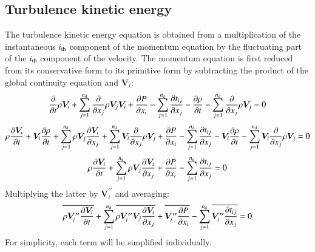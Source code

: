 \documentclass{warpdoc}
\newcommand{\nd}{{{n}_{\rm d}}}
\begin{document}
\subsection{Turbulence kinetic energy}

The turbulence kinetic energy equation is obtained from a multiplication
of the instantaneous $i_{\rm th}$ component of the momentum equation by the fluctuating part of the
$i_{\rm th}$ component of the velocity. The momentum equation is first reduced from its conservative
form to its primitive form by subtracting the product of the
global continuity equation and $\bm{V}_i$:
%
\begin{displaymath}
    \frac{\partial} {\partial t}  \rho \bm{V}_i
   +  \sum_{j=1}^{\nd} \frac{\partial }{\partial x_j} \rho \bm{V}_j \bm{V}_i
   +  \frac{\partial P}{\partial x_i}
   -  \sum_{j=1}^{\nd} \frac{\partial t_{ij}}{\partial x_j}
   - \frac{\partial \rho }{\partial t} - \sum_{j=1}^{\nd} \frac{\partial  }{\partial x_j} \rho \bm{V}_j  = 0
\end{displaymath}
%
%
\begin{displaymath}
    \rho\frac{\partial \bm{V}_i }{\partial t}
   +  \bm{V}_i\frac{\partial \rho}{\partial t}
   +   \sum_{j=1}^{\nd} \rho \bm{V}_j \frac{\partial \bm{V}_i }{\partial x_j}
   +  \sum_{j=1}^{\nd} \bm{V}_i \frac{\partial }{\partial x_j} \rho \bm{V}_j
   +  \frac{\partial P}{\partial x_i}
   -  \sum_{j=1}^{\nd} \frac{\partial t_{ij}}{\partial x_j}
   - \bm{V}_i \frac{\partial \rho }{\partial t} - \sum_{j=1}^{\nd} \bm{V}_i \frac{\partial  }{\partial x_j} \rho \bm{V}_j  = 0
\end{displaymath}
%
%
\begin{displaymath}
   \rho\frac{\partial \bm{V}_i }{\partial t}
   +   \sum_{j=1}^{\nd} \rho  \bm{V}_j  \frac{\partial \bm{V}_i }{\partial x_j}
   +  \frac{\partial P}{\partial x_i}
   -  \sum_{j=1}^{\nd} \frac{\partial t_{ij}}{\partial x_j}
   = 0
\end{displaymath}
%
Multiplying the latter by $\bm{V}_i^{\prime\prime}$ and averaging:
%
\begin{equation}
   \overline{\rho \bm{V}_i^{\prime\prime} \frac{\partial \bm{V}_i }{\partial t}}
   + \sum_{j=1}^{\nd} \overline{\rho \bm{V}_i^{\prime\prime} \bm{V}_j \frac{\partial \bm{V}_i }{\partial x_j}}
   + \overline{\bm{V}_i^{\prime\prime} \frac{\partial P}{\partial x_i}}
   - \sum_{j=1}^{\nd} \overline{ \bm{V}_i^{\prime\prime}\frac{\partial t_{ij}}{\partial x_j}}
   = 0
  \label{eqn:TKE:1}
\end{equation}
%
For simplicity, each term will be simplified individually.
\end{document}

